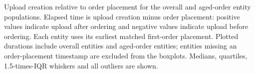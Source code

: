 
Upload creation relative to order placement for the overall
and aged-order entity populations. Elapsed time is upload creation minus order
placement: positive values indicate upload after ordering and negative values
indicate upload before ordering. Each entity uses its earliest matched first-order
placement. Plotted durations include \UploadDelayOverallN{} overall entities and \UploadDelayAgedN{} aged-order
entities; entities missing an order-placement timestamp are excluded from the
boxplots. Medians, quartiles, 1.5-times-IQR whiskers and all outliers are shown.

